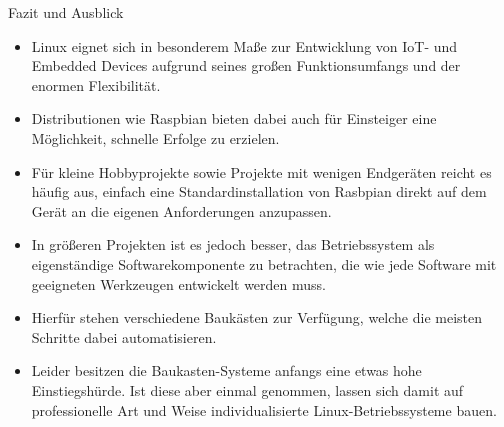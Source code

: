 

\begin{frame}{Fazit und Ausblick}
    \begin{itemize}
        \justifying

        \item Linux eignet sich in besonderem Maße zur Entwicklung von IoT-
        und Embedded Devices aufgrund seines großen Funktionsumfangs und der
        enormen Flexibilität.

        \item Distributionen wie Raspbian bieten dabei auch für Einsteiger
        eine Möglichkeit, schnelle Erfolge zu erzielen.

        \item Für kleine Hobbyprojekte sowie Projekte mit wenigen Endgeräten
        reicht es häufig aus, einfach eine Standardinstallation von Rasbpian
        direkt auf dem Gerät an die eigenen Anforderungen anzupassen.

        \item In größeren Projekten ist es jedoch besser, das Betriebssystem als
        eigenständige Softwarekomponente zu betrachten, die wie jede Software
        mit geeigneten Werkzeugen \glqq{}entwickelt\grqq{} werden muss.

        \item Hierfür stehen verschiedene Baukästen zur Verfügung, welche die
        meisten Schritte dabei automatisieren.

        \item Leider besitzen die Baukasten-Systeme anfangs eine etwas hohe
        Einstiegshürde. Ist diese aber einmal genommen, lassen sich damit auf
        professionelle Art und Weise individualisierte Linux-Betriebssysteme bauen.
    \end{itemize}
\end{frame}

